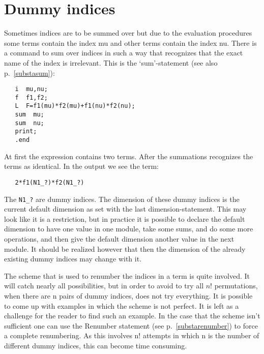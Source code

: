 \section{Dummy indices}

\label{sect-dummies}
Sometimes indices are to be summed over but due to the 
evaluation procedures some terms contain the index mu and other terms 
contain the index nu. There is a command to sum over indices in such a way 
that {\FORM} recognizes that the exact name of the index is irrelevant. 
This is the `sum'-statement (see also p.~\ref{substasum}): \begin{verbatim}
   i  mu,nu;
   f  f1,f2;
   L  F=f1(mu)*f2(mu)+f1(nu)*f2(nu);
   sum  mu;
   sum  nu;
   print;
   .end
\end{verbatim}
At first the expression contains two terms. After the summations {\FORM} 
recognizes the terms as identical. In the output we see the term: 
\begin{verbatim}
   2*f1(N1_?)*f2(N1_?)
\end{verbatim}
The \verb:N1_?: are dummy indices. 
The dimension of these dummy indices is the current 
default dimension as set with the last 
dimension-statement. This may look like it is a restriction, but in 
practice it is possible to declare the default dimension to have one 
value in one module, take some sums, and do some more operations, and 
then give the default dimension another value in the next module. It should 
be realized however that then the dimension of the already existing dummy 
indices may change with it.

The scheme that is used to renumber the 
indices in a term is quite 
involved. It will catch nearly all possibilities, but in order to avoid 
to try all $n!$ permutations, when there are n pairs of dummy indices, 
{\FORM} does not try everything. It is possible to come up with examples 
in which the scheme is not perfect. It is left as a 
challenge for the reader to find such an example. In the case that the 
scheme isn't sufficient one can use the Renumber statement (see 
p.~\ref{substarenumber}) to force a complete renumbering. As this involves 
n! attempts in which n is the number of different dummy indices, this can 
become time consuming.

